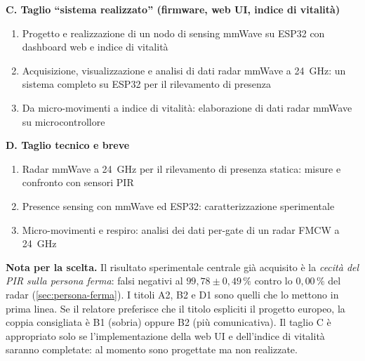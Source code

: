 \vspace{0.6em}
\noindent\textbf{C. Taglio ``sistema realizzato'' (firmware, web UI, indice di vitalità)}
\begin{enumerate}[label=C\arabic*.,leftmargin=2.2em,itemsep=3pt]
  \item Progetto e realizzazione di un nodo di sensing mmWave su ESP32 con
        dashboard web e indice di vitalità
  \item Acquisizione, visualizzazione e analisi di dati radar mmWave a 24~GHz: un
        sistema completo su ESP32 per il rilevamento di presenza
  \item Da micro-movimenti a indice di vitalità: elaborazione di dati radar mmWave
        su microcontrollore
\end{enumerate}

\vspace{0.6em}
\noindent\textbf{D. Taglio tecnico e breve}
\begin{enumerate}[label=D\arabic*.,leftmargin=2.2em,itemsep=3pt]
  \item Radar mmWave a 24~GHz per il rilevamento di presenza statica: misure e
        confronto con sensori PIR
  \item Presence sensing con mmWave ed ESP32: caratterizzazione sperimentale
  \item Micro-movimenti e respiro: analisi dei dati per-gate di un radar FMCW a
        24~GHz
\end{enumerate}

\vspace{1.2em}
\noindent\textbf{Nota per la scelta.} Il risultato sperimentale centrale già
acquisito è la \emph{cecità del PIR sulla persona ferma}: falsi negativi al
$99{,}78 \pm 0{,}49\,\%$ contro lo $0{,}00\,\%$ del radar
(\cref{sec:persona-ferma}). I titoli A2, B2 e D1 sono quelli che lo mettono in
prima linea. Se il relatore preferisce che il titolo espliciti il progetto europeo,
la coppia consigliata è B1 (sobria) oppure B2 (più comunicativa). Il taglio C è
appropriato solo se l'implementazione della web UI e dell'indice di vitalità
saranno completate: al momento sono progettate ma non realizzate.

\cleardoublepage

